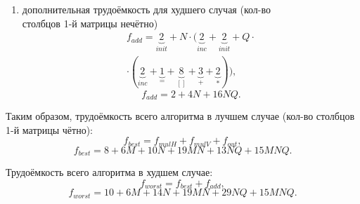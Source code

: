 \begin{enumerate}
	\item дополнительная трудоёмкость для худшего случая (кол-во\\
	столбцов 1-й матрицы нечётно)
	\begin{equation}
		\begin{gathered}
			f_{add} = \underbrace{2}_{init} + N \cdot (\underbrace{2}_{inc} + \underbrace{2}_{init} + Q \cdot \\
			\cdot (\underbrace{2}_{inc} + \underbrace{1}_{=} + \underbrace{8}_{[]} + \underbrace{3}_{+} + \underbrace{2}_{*})),
		\end{gathered}
	\end{equation}
	\begin{equation}
		f_{add} = 2 + 4N + 16NQ.
	\end{equation}
\end{enumerate}

Таким образом, трудоёмкость всего алгоритма в лучшем случае (кол-во столбцов 1-й матрицы чётно):
\begin{equation}
	f_{best} = f_{mulH} + f_{mulV} + f_{out},
\end{equation}
\begin{equation}
	f_{best} = 8 + 6M + 10N + 19MN + 13 NQ + 15 MNQ.
\end{equation}

Трудоёмкость всего алгоритма в худшем случае:
\begin{equation}
	f_{worst} = f_{best} + f_{add},
\end{equation}
\begin{equation}
	f_{worst} = 10 + 6M + 14N + 19MN + 29NQ + 15 MNQ.
\end{equation}









